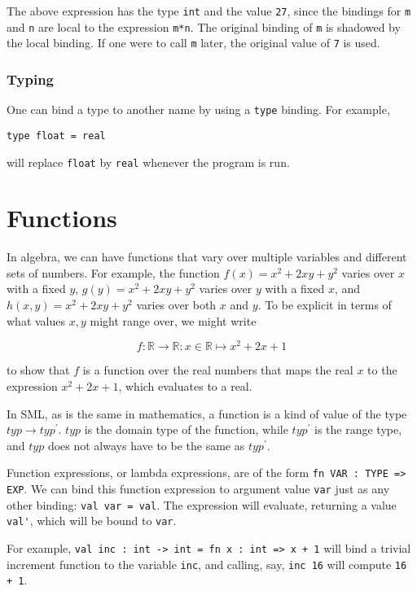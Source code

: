 \documentclass[11pt]{article}
\begin{document}
The above expression has the type \verb~int~ and the value \verb~27~, since the bindings for \verb~m~ and \verb~n~ are local to the expression \verb~m*n~. The original binding of \verb~m~ is shadowed by the local binding. If one were to call \verb~m~ later, the original value of \verb~7~ is used.

\subsubsection{Typing}

One can bind a type to another name by using a \verb~type~ binding. For example, 

\verb~type float = real~ 

will replace \verb~float~ by \verb~real~ whenever the program is run.

\section{Functions}
In algebra, we can have functions that vary over multiple variables and different sets of numbers. For example, the function $f(x) = x^2 + 2xy + y^2$ varies over $x$ with a fixed $y$, $g(y) = x^2 + 2xy + y^2$ varies over $y$ with a fixed $x$, and $h(x,y) = x^2 + 2xy + y^2$ varies over both $x$ and $y$. To be explicit in terms of what values $x,y$ might range over, we might write

\[
	f : \mathds{R} \rightarrow \mathds{R} : x \in \mathds{R} \mapsto x^2 + 2x + 1
\]

to show that $f$ is a function over the real numbers that maps the real $x$ to the expression $x^2 + 2x + 1$, which evaluates to a real. 

In SML, as is the same in mathematics, a function is a kind of value of the type $typ \rightarrow typ^{\prime}$. $typ$ is the domain type of the function, while $typ^{\prime}$ is the range type, and $typ$ does not always have to be the same as $typ^{\prime}$. 

Function expressions, or lambda expressions, are of the form \verb~fn VAR : TYPE => EXP~. We can bind this function expression to argument value \verb~var~ just as any other binding: \verb~val var = val~. The expression will evaluate, returning a value \verb~val'~, which will be bound to \verb~var~.

For example, \verb~val inc : int -> int = fn x : int => x + 1~ will bind a trivial increment function to the variable \verb~inc~, and calling, say, \verb~inc 16~ will compute \verb~16 + 1~.
\end{document}
